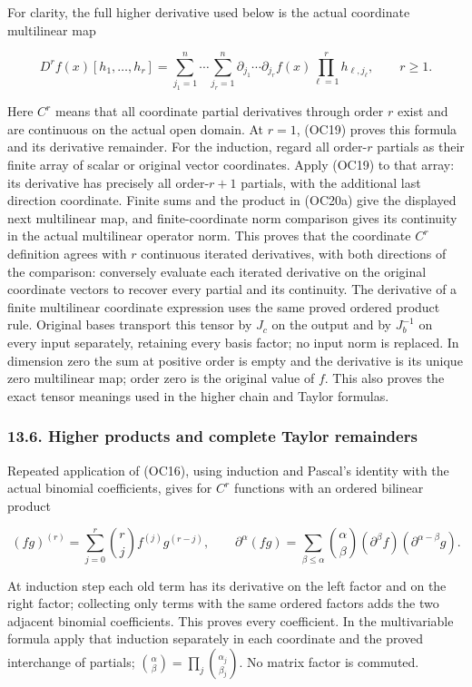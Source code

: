 \documentclass[
  11pt,
]{article}
\begin{document}
For clarity, the full higher derivative used below is the actual
coordinate multilinear map

\[
 D^r f(x)[h_1,\ldots,h_r]
 =\sum_{j_1=1}^n\cdots\sum_{j_r=1}^n
    \partial_{j_1}\cdots\partial_{j_r}f(x)
       \prod_{\ell=1}^r h_{\ell,j_\ell},
 \qquad r\ge1.
\tag{OC20a}
\]

Here \(C^r\) means that all coordinate partial derivatives through order
\(r\) exist and are continuous on the actual open domain. At \(r=1\),
(OC19) proves this formula and its derivative remainder. For the
induction, regard all order-\(r\) partials as their finite array of
scalar or original vector coordinates. Apply (OC19) to that array: its
derivative has precisely all order-\(r+1\) partials, with the additional
last direction coordinate. Finite sums and the product in (OC20a) give
the displayed next multilinear map, and finite-coordinate norm
comparison gives its continuity in the actual multilinear operator norm.
This proves that the coordinate \(C^r\) definition agrees with \(r\)
continuous iterated derivatives, with both directions of the comparison:
conversely evaluate each iterated derivative on the original coordinate
vectors to recover every partial and its continuity. The derivative of a
finite multilinear coordinate expression uses the same proved ordered
product rule. Original bases transport this tensor by \(J_c\) on the
output and by \(J_b^{-1}\) on every input separately, retaining every
basis factor; no input norm is replaced. In dimension zero the sum at
positive order is empty and the derivative is its unique zero
multilinear map; order zero is the original value of \(f\). This also
proves the exact tensor meanings used in the higher chain and Taylor
formulas.

\subsubsection{13.6. Higher products and complete Taylor
remainders}\label{higher-products-and-complete-taylor-remainders}

Repeated application of (OC16), using induction and Pascal's identity
with the actual binomial coefficients, gives for \(C^r\) functions with
an ordered bilinear product

\[
 (fg)^{(r)}=\sum_{j=0}^r\binom rj f^{(j)}g^{(r-j)},\qquad
 \partial^\alpha(fg)=
 \sum_{\beta\le\alpha}\binom\alpha\beta
    (\partial^\beta f)(\partial^{\alpha-\beta}g).
\tag{OC21}
\]

At induction step each old term has its derivative on the left factor
and on the right factor; collecting only terms with the same ordered
factors adds the two adjacent binomial coefficients. This proves every
coefficient. In the multivariable formula apply that induction
separately in each coordinate and the proved interchange of partials;
\(\binom\alpha\beta=\prod_j\binom{\alpha_j}{\beta_j}\). No matrix factor
is commuted.
\end{document}
